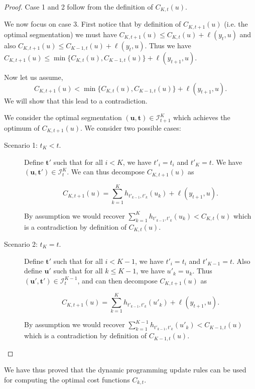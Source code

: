 \documentclass{article}
\newcommand{\FCC}{C}
\begin{document}
\begin{proof}
Case 1 and 2 follow from the definition of $\FCC_{K,t}(u)$.

We now focus on case 3.
First notice that by definition of $\FCC_{K,t+1}(u)$ (i.e. the optimal segmentation) we must have
$\FCC_{K,t+1}(u) \leq \FCC_{K,t}(u) + \ell(y_t,u)$ and also
$\FCC_{K,t+1}(u) \leq \FCC_{K-1,t}(u) + \ell(y_t,u)$. Thus we have
$\FCC_{K,t+1}(u) \leq \min \{ \FCC_{K,t}(u) , \FCC_{K-1,t}(u) \} + \ell(y_{t+1},u)$.

Now let us assume,
$$\FCC_{K,t+1}(u) < \min \{ \FCC_{K,t}(u) , \FCC_{K-1,t}(u) \} + \ell(y_{t+1},u).$$
We will show that this lead to a contradiction.

We consider the optimal segmentation
$(\mathbf u, \mathbf t)\in{\mathcal I}_{t+1}^K$ which achieves the
optimum of $\FCC_{K,t+1}(u)$. We consider two possible cases:
\begin{description}
\item[Scenario 1: $t_K < t$.]  Define $\mathbf t'$ such that for all
  $i < K$, we have $t'_i = t_i$ and $t'_K = t$.  We have
  $(\mathbf u, \mathbf t')\in{\mathcal I}_{t}^K$.  We can thus
  decompose $\FCC_{K,t+1}(u)$ as

$$\FCC_{K,t+1}(u) = \sum_{k=1}^K
  h_{t'_{k-1}, t'_k}(u_k) + \ell(y_{t+1},u).$$ 

By assumption we would recover $\sum_{k=1}^K h_{t'_{k-1}, t'_k}(u_k) < \FCC_{K,t}(u)$ which is a contradiction
by definition of $\FCC_{K,t}(u)$. 

\item[Scenario 2: $t_K=t$.]  Define $\mathbf t'$ such that for all
  $i < K-1$, we have $t'_i = t_i$ and $t'_{K-1} = t$. Also define
  $\mathbf u'$ such that for all $k \leq K-1$, we have $u'_k = u_k$.
  Thus $(\mathbf u', \mathbf t')\in{\mathcal I}_{t}^{K-1}$, and can
  then decompose $\FCC_{K,t+1}(u)$ as

$$\FCC_{K,t+1}(u) = \sum_{k=1}^K
  h_{t'_{k-1}, t'_k}(u'_k) + \ell(y_{t+1},u).$$ 

By assumption we would recover $\sum_{k=1}^{K-1} h_{t'_{k-1}, t'_k}(u'_k) < \FCC_{K-1,t}(u)$ which is a contradiction
by definition of $\FCC_{K-1,t}(u)$. 
\end{description}
\end{proof}
We have thus proved that the dynamic programming update rules can be
used for computing the optimal cost functions $C_{k,t}$.
\end{document}
